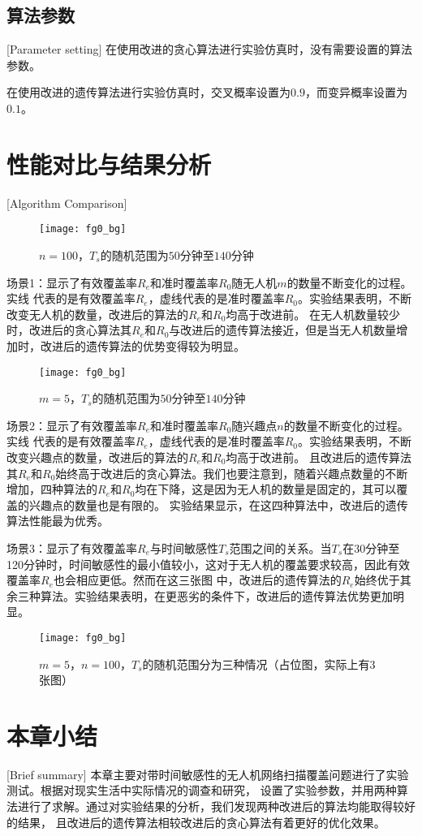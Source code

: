 \subsection{算法参数}[Parameter setting]
在使用改进的贪心算法进行实验仿真时，没有需要设置的算法参数。


在使用改进的遗传算法进行实验仿真时，交叉概率设置为$0.9$，而变异概率设置为$0.1$。
\section{性能对比与结果分析}[Algorithm Comparison]
\begin{figure}[h]
	\centering
	\texttt{[image: fg0\_bg]}
	\caption{$n = 100$，$T_s$的随机范围为$50$分钟至$140$分钟}
	\label{fg501}
\end{figure}
场景1：显示了有效覆盖率$R_e$和准时覆盖率$R_0$随无人机$m$的数量不断变化的过程。实线
代表的是有效覆盖率$R_e$，虚线代表的是准时覆盖率$R_0$。实验结果表明，不断改变无人机的数量，改进后的算法的$R_e$和$R_0$均高于改进前。
在无人机数量较少时，改进后的贪心算法其$R_e$和$R_0$与改进后的遗传算法接近，但是当无人机数量增加时，改进后的遗传算法的优势变得较为明显。
\begin{figure}[h]
\centering
\texttt{[image: fg0\_bg]}
\caption{$m = 5$，$T_s$的随机范围为$50$分钟至$140$分钟}
\label{fg502}
\end{figure}


场景2：显示了有效覆盖率$R_e$和准时覆盖率$R_0$随兴趣点$n$的数量不断变化的过程。实线
代表的是有效覆盖率$R_e$，虚线代表的是准时覆盖率$R_0$。实验结果表明，不断改变兴趣点的数量，改进后的算法的$R_e$和$R_0$均高于改进前。
且改进后的遗传算法其$R_e$和$R_0$始终高于改进后的贪心算法。我们也要注意到，随着兴趣点数量的不断增加，四种算法的$R_e$和$R_0$均在下降，这是因为无人机的数量是固定的，其可以覆盖的兴趣点的数量也是有限的。
实验结果显示，在这四种算法中，改进后的遗传算法性能最为优秀。


场景3：显示了有效覆盖率$R_e$与时间敏感性$T_s$范围之间的关系。当$T_s$在30分钟至120分钟时，时间敏感性的最小值较小，这对于无人机的覆盖要求较高，因此有效覆盖率$R_e$也会相应更低。然而在这三张图
中，改进后的遗传算法的$R_e$始终优于其余三种算法。实验结果表明，在更恶劣的条件下，改进后的遗传算法优势更加明显。
\begin{figure}[h]
	\centering
	\texttt{[image: fg0\_bg]}
	\caption{$m = 5$，$n = 100$，$T_s$的随机范围分为三种情况（占位图，实际上有3张图）}
	\label{fg503}
	\end{figure}

\section{本章小结}[Brief summary]
本章主要对带时间敏感性的无人机网络扫描覆盖问题进行了实验测试。根据对现实生活中实际情况的调查和研究，
设置了实验参数，并用两种算法进行了求解。通过对实验结果的分析，我们发现两种改进后的算法均能取得较好的结果，
且改进后的遗传算法相较改进后的贪心算法有着更好的优化效果。

